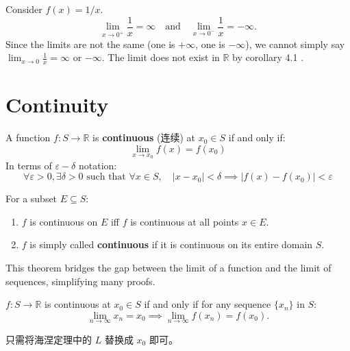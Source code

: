 \documentclass[
	UTF-8,
	11pt, %
	a4paper, %
]{LegrandOrangeBook}
\begin{document}
    \begin{example}
    Consider $f(x) = 1/x$.
    \[ \lim_{x \to 0^+} \frac{1}{x} = \infty \quad \text{and} \quad \lim_{x \to 0^-} \frac{1}{x} = -\infty. \]
    Since the limits are not the same (one is $+\infty$, one is $-\infty$), 
    we cannot simply say $\lim_{x \to 0} \frac{1}{x} = \infty$ or $-\infty$. 
    The limit does not exist in $\mathbb{R}$ by corollary 4.1 .
    \end{example}

    \newpage

    \section{Continuity}

    \begin{definition}
    A function $f: S \to \mathbb{R}$ is \textbf{continuous} (连续) at $x_0 \in S$ if and only if:
    \[ \lim_{x \to x_0} f(x) = f(x_0) \]
    In terms of $\varepsilon-\delta$ notation:
    \[ \forall \varepsilon > 0, \exists \delta > 0 \text{ such that } \forall x \in S, \quad |x - x_0| < \delta \implies |f(x) - f(x_0)| < \varepsilon \]
    \end{definition}

    \begin{definition}
    For a subset $E \subseteq S$:
    \begin{enumerate}
        \item $f$ is continuous on $E$ iff $f$ is continuous at all points $x \in E$.
        \item $f$ is simply called \textbf{continuous} if it is continuous on its entire domain $S$.
    \end{enumerate}
    \end{definition}

    This theorem bridges the gap between the limit of a function and the limit of sequences, simplifying many proofs.

    \begin{theorem}
    $f: S \to \mathbb{R}$ is continuous at $x_0 \in S$ if and only if for any sequence $\{x_n\}$ in $S$:
    \[ \lim_{n \to \infty} x_n = x_0 \implies \lim_{n \to \infty} f(x_n) = f(x_0). \]
    \end{theorem}
    \begin{remark}
        只需将海涅定理中的 $L$ 替换成 $x_0$ 即可。
    \end{remark}
\end{document}

